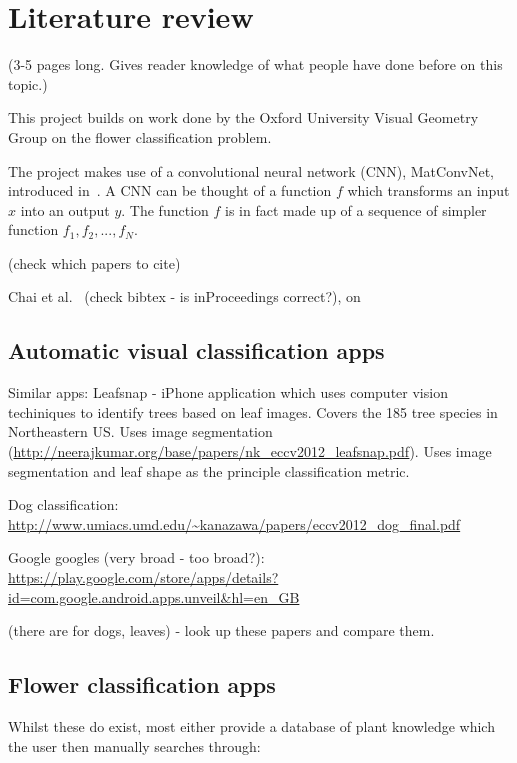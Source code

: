 \documentclass[11pt, a4paper]{report}
\begin{document}
\chapter{Literature review}

(3-5 pages long. Gives reader knowledge of what people have done before on this topic.) 


This project builds on work done by the Oxford University Visual Geometry Group on the flower classification problem. 

The project makes use of a convolutional neural network (CNN), MatConvNet, introduced in~\cite{arXiv:1412.4564}. A CNN can be thought of a function $f$ which transforms an input $x$ into an output $y$. The function $f$ is in fact made up of a sequence of simpler function $f_1, f_2, ..., f_N$. 

(check which papers to cite) 

Chai et al.~\cite{Chai11} (check bibtex - is inProceedings correct?), on 















\section{Automatic visual classification apps}

Similar apps:
Leafsnap - iPhone application which uses computer vision techiniques to identify trees based on leaf images. Covers the 185 tree species in Northeastern US. Uses image segmentation (\url{http://neerajkumar.org/base/papers/nk_eccv2012_leafsnap.pdf}). Uses image segmentation and leaf shape as the principle classification metric. 

Dog classification:
\url{http://www.umiacs.umd.edu/~kanazawa/papers/eccv2012_dog_final.pdf}

Google googles (very broad - too broad?):
\url{https://play.google.com/store/apps/details?id=com.google.android.apps.unveil&hl=en_GB}


 (there are for dogs, leaves) - look up these papers and compare them.

\section{Flower classification apps}
Whilst these do exist, most either provide a database of plant knowledge which the user then manually searches through:
\end{document}
